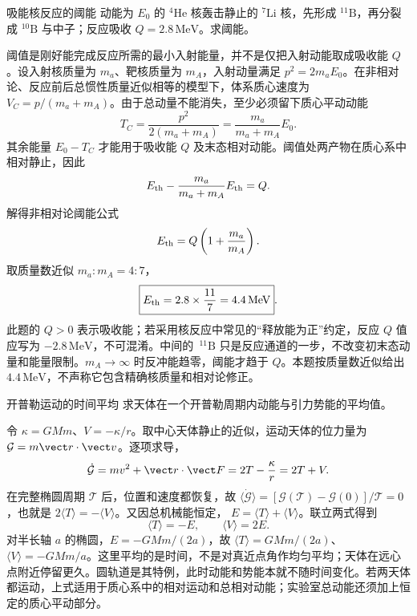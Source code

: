 \begin{practicebox}{吸能核反应的阈能}
动能为 $E_0$ 的 ${}^{4}\mathrm{He}$ 核轰击静止的 ${}^{7}\mathrm{Li}$ 核，先形成 ${}^{11}\mathrm B$，再分裂成 ${}^{10}\mathrm B$ 与中子；反应吸收 $Q=2.8\,\mathrm{MeV}$。求阈能。
\label{r2ch02:pr:011}
\begin{solution}
阈值是刚好能完成反应所需的最小入射能量，并不是仅把入射动能取成吸收能 $Q$。设入射核质量为 $m_a$、靶核质量为 $m_A$，入射动量满足 $p^2=2m_aE_0$。在非相对论、反应前后总惯性质量近似相等的模型下，体系质心速度为 $V_C=p/(m_a+m_A)$。由于总动量不能消失，至少必须留下质心平动动能
\[
 T_C=\frac{p^2}{2(m_a+m_A)}
 =\frac{m_a}{m_a+m_A}E_0.
\]
其余能量 $E_0-T_C$ 才能用于吸收能 $Q$ 及末态相对动能。阈值处两产物在质心系中相对静止，因此
\[
 E_{\rm th}-\frac{m_a}{m_a+m_A}E_{\rm th}=Q.
\]
解得非相对论阈能公式
\[
 E_{\rm th}=Q\left(1+\frac{m_a}{m_A}\right).
\]
取质量数近似 $m_a:m_A=4:7$，
\[
 \boxed{E_{\rm th}=2.8\times\frac{11}{7}=4.4\,\mathrm{MeV}}.
\]
此题的 $Q>0$ 表示吸收能；若采用核反应中常见的“释放能为正”约定，反应 $Q$ 值应写为 $-2.8\,\mathrm{MeV}$，不可混淆。中间的 $\,{}^{11}\mathrm B$ 只是反应通道的一步，不改变初末态动量和能量限制。$m_A\to\infty$ 时反冲能趋零，阈能才趋于 $Q$。本题按质量数近似给出 $4.4\,\mathrm{MeV}$，不声称它包含精确核质量和相对论修正。
\end{solution}
\end{practicebox}

\begin{practicebox}{开普勒运动的时间平均}
求天体在一个开普勒周期内动能与引力势能的平均值。
\label{r2ch02:pr:012}
\begin{solution}
令 $\kappa=GMm$、$V=-\kappa/r$。取中心天体静止的近似，运动天体的位力量为 $\mathcal G=m\vect r\cdot\vect v$。逐项求导，
\[
 \dot{\mathcal G}=mv^2+\vect r\cdot\vect F=2T-\frac{\kappa}{r}=2T+V.
\]
在完整椭圆周期 $\mathcal T$ 后，位置和速度都恢复，故
$\langle\dot{\mathcal G}\rangle=[\mathcal G(\mathcal T)-\mathcal G(0)]/\mathcal T=0$，也就是
$2\langle T\rangle=-\langle V\rangle$。又因总机械能恒定，
$E=\langle T\rangle+\langle V\rangle$。联立两式得到
\[
 \boxed{\langle T\rangle=-E},\qquad
 \boxed{\langle V\rangle=2E}.
\]
对半长轴 $a$ 的椭圆，$E=-GMm/(2a)$，故
$\langle T\rangle=GMm/(2a)$、$\langle V\rangle=-GMm/a$。这里平均的是时间，不是对真近点角作均匀平均；天体在远心点附近停留更久。圆轨道是其特例，此时动能和势能本就不随时间变化。若两天体都运动，上式适用于质心系中的相对运动和总相对动能；实验室总动能还须加上恒定的质心平动部分。
\end{solution}
\end{practicebox}

